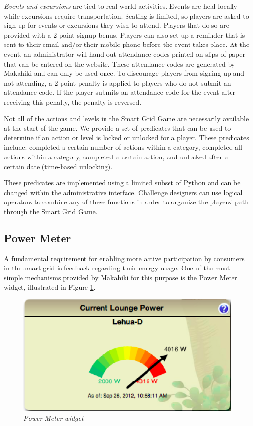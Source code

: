 {\em Events and excursions} are tied to real world activities. Events are held locally while excursions require transportation. Seating is limited, so players are asked to sign up for events or excursions they wish to attend. Players that do so are provided with a 2 point signup bonus. Players can also set up a reminder that is sent to their email and/or their mobile phone before the event takes place. At the event, an administrator will hand out attendance codes printed on slips of paper that can be entered on the website. These attendance codes are generated by Makahiki and can only be used once. To discourage players from signing up and not attending, a 2 point penalty is applied to players who do not submit an attendance code. If the player submits an attendance code for the event after receiving this penalty, the penalty is reversed.

Not all of the actions and levels in the Smart Grid Game are necessarily available at
the start of the game. We provide a set of predicates that can be used to determine if an action or level is locked or unlocked for a player. These predicates include: completed a certain number of actions within a category, completed all actions within a category, completed a certain action, and unlocked after a certain date (time-based unlocking).

These predicates are implemented using a limited subset of Python and can
be changed within the administrative interface. Challenge designers can use
logical operators to combine any of these functions in order to organize
the players' path through the Smart Grid Game.

\subsection{Power Meter}

A fundamental requirement for enabling more active participation by consumers in the smart grid is feedback regarding their energy usage.  One of the most simple mechanisms provided by Makahiki for this purpose is the Power Meter widget, illustrated in Figure \ref{fig:PowerMeter}.

\begin{figure}[th]
  \center
  \includegraphics[width=0.95\columnwidth]{power-meter.eps}
  \caption{\em Power Meter widget}
  \label{fig:PowerMeter}
\end{figure}

